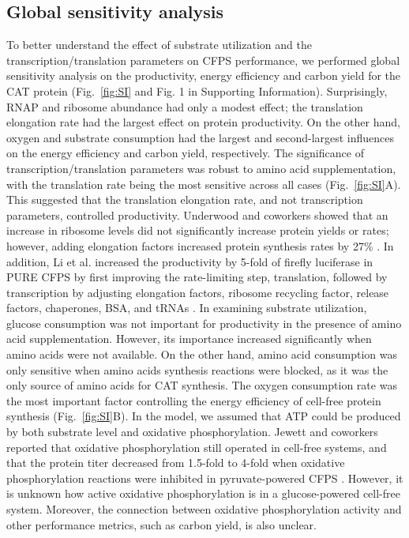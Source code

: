 \documentclass[journal=asbcd6,manuscript=article]{achemso}
\begin{document}

\subsection{Global sensitivity analysis}
To better understand the effect of substrate utilization and the transcription/translation parameters on CFPS performance, we performed global sensitivity analysis on the productivity, energy efficiency and carbon yield for the CAT protein (Fig.~\ref{fig:SI} and Fig. 1 in Supporting Information).
Surprisingly, RNAP and ribosome abundance had only a modest effect; the translation elongation rate had the largest effect on protein productivity.
On the other hand, oxygen and substrate consumption had the largest and second-largest influences on the energy efficiency and carbon yield, respectively.
The significance of transcription/translation parameters was robust to amino acid supplementation, with the translation rate being the most sensitive across all cases (Fig.~\ref{fig:SI}A).
This suggested that the translation elongation rate, and not transcription parameters, controlled productivity.
Underwood and coworkers showed that an increase in ribosome levels did not significantly increase protein yields or rates; however, adding elongation factors increased protein synthesis rates by 27\% \cite{2005_underwood_biotech}.
In addition, Li et al. increased the productivity by 5-fold of firefly luciferase in PURE CFPS by first improving the rate-limiting step, translation, followed by transcription by adjusting elongation factors, ribosome recycling factor, release factors, chaperones, BSA, and tRNAs \cite{2014_li_PlosOne}.
In examining substrate utilization, glucose consumption was not important for productivity in the presence of amino acid supplementation.
However, its importance increased significantly when amino acids were not available.
On the other hand, amino acid consumption was only sensitive when amino acids synthesis reactions were blocked, as it was the only source of amino acids for CAT synthesis.
The oxygen consumption rate was the most important factor controlling the energy efficiency of cell-free protein synthesis (Fig.~\ref{fig:SI}B).
In the model, we assumed that ATP could be produced by both substrate level and oxidative phosphorylation.
Jewett and coworkers reported that oxidative phosphorylation still operated in cell-free systems, and that the protein titer decreased from 1.5-fold to 4-fold when oxidative phosphorylation reactions were inhibited in pyruvate-powered CFPS \cite{Jewett:2008aa}.
However, it is unknown how active oxidative phosphorylation is in a glucose-powered cell-free system.
Moreover, the connection between oxidative phosphorylation activity and other performance metrics, such as carbon yield, is also unclear.
\end{document}

